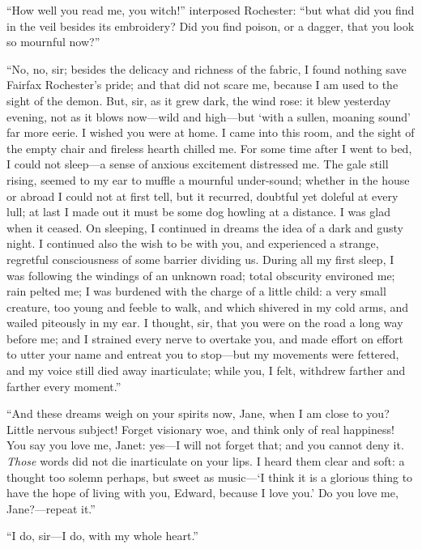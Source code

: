 \enquote{How well you read me, you witch!} interposed \Mr{} Rochester:
\enquote{but what did you find in the veil besides its embroidery?  Did
	you find poison, or a dagger, that you look so mournful now?}

\enquote{No, no, sir; besides the delicacy and richness of the fabric, I
	found nothing save Fairfax Rochester's pride; and that did not scare me,
	because I am used to the sight of the demon.  But, sir, as it grew dark,
	the wind rose: it blew yesterday evening, not as it blows now---wild and
	high---but \enquote{with a sullen, moaning sound} far more eerie.  I
	wished you were at home.  I came into this room, and the sight of the
	empty chair and fireless hearth chilled me.  For some time after I went
	to bed, I could not sleep---a sense of anxious excitement distressed
	me.  The gale still rising, seemed to my ear to muffle a mournful
	under-sound; whether in the house or abroad I could not at first tell,
	but it recurred, doubtful yet doleful at every lull; at last I made out
	it must be some dog howling at a distance.  I was glad when it ceased.
	On sleeping, I continued in dreams the idea of a dark and gusty night.
	I continued also the wish to be with you, and experienced a strange,
	regretful consciousness of some barrier dividing us.  During all my
	first sleep, I was following the windings of an unknown road; total
	obscurity environed me; rain pelted me; I was burdened with the charge
	of a little child: a very small creature, too young and feeble to walk,
	and which shivered in my cold arms, and wailed piteously in my ear.  I
	thought, sir, that you were on the road a long way before me; and I
	strained every nerve to overtake you, and made effort on effort to utter
	your name and entreat you to stop---but my movements were fettered, and
	my voice still died away inarticulate; while you, I felt, withdrew
	farther and farther every moment.}

\enquote{And these dreams weigh on your spirits now, Jane, when I am close to
	you?  Little nervous subject!  Forget visionary woe, and think only of
	real happiness!  You say you love me, Janet: yes---I will not forget
	that; and you cannot deny it.  \emph{Those} words did not die
	inarticulate on your lips.  I heard them clear and soft: a thought too
	solemn perhaps, but sweet as music---\enquote{I think it is a glorious thing to
		have the hope of living with you, Edward, because I love you.}  Do you
	love me, Jane?---repeat it.}

\enquote{I do, sir---I do, with my whole heart.}

